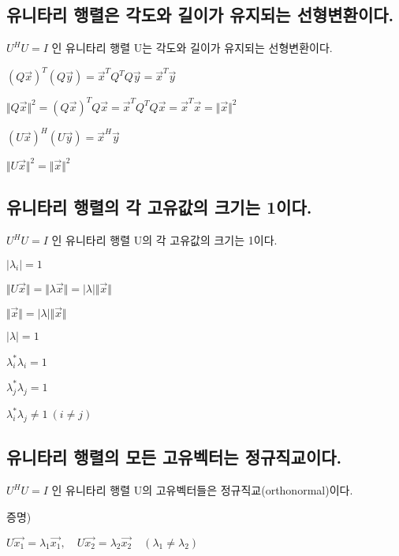 \newpage
\subsection{유니타리 행렬은 각도와 길이가 유지되는 선형변환이다.}

\begin{theorem}
$U^HU=I$ 인 유니타리 행렬 U는 각도와 길이가 유지되는 선형변환이다.

$(Q\vec{x})^T(Q\vec{y})=\vec{x}^TQ^TQ\vec{y}=\vec{x}^T\vec{y}$

$\Vert Q\vec{x} \Vert^2=(Q\vec{x})^TQ\vec{x}=\vec{x}^TQ^TQ\vec{x}=\vec{x}^T\vec{x}=\Vert \vec{x} \Vert^2$

$(U\vec{x})^H(U\vec{y})=\vec{x}^H\vec{y}$

$\Vert U\vec{x} \Vert^2 = \Vert \vec{x} \Vert^2$
\end{theorem}


\newpage
\subsection{유니타리 행렬의 각 고유값의 크기는 1이다. }

\begin{theorem}
$U^HU=I$ 인 유니타리 행렬 U의 각 고유값의 크기는 1이다.

$\vert \lambda_i \vert = 1$

$\Vert U\vec{x} \Vert = \Vert \lambda\vec{x} \Vert = \vert \lambda \vert \Vert \vec{x} \Vert $

$\Vert \vec{x} \Vert =\vert \lambda \vert \Vert \vec{x} \Vert $

$\vert \lambda \vert=1$


$\lambda_i^{\ast}\lambda_i=1$

$\lambda_j^{\ast}\lambda_j=1$

$\lambda_i^{\ast}\lambda_j \ne 1  \ (i \ne j)$

\end{theorem}
\newpage
\subsection{유니타리 행렬의 모든 고유벡터는 정규직교이다.}

\begin{theorem}
$U^HU=I$ 인 유니타리 행렬 U의 고유벡터들은 정규직교(orthonormal)이다.
\end{theorem}

증명)

$U\vec{x_1} = \lambda_1\vec{x_1},\quad U\vec{x_2} = \lambda_2\vec{x_2} \quad (\lambda_1 \ne \lambda_2)$


